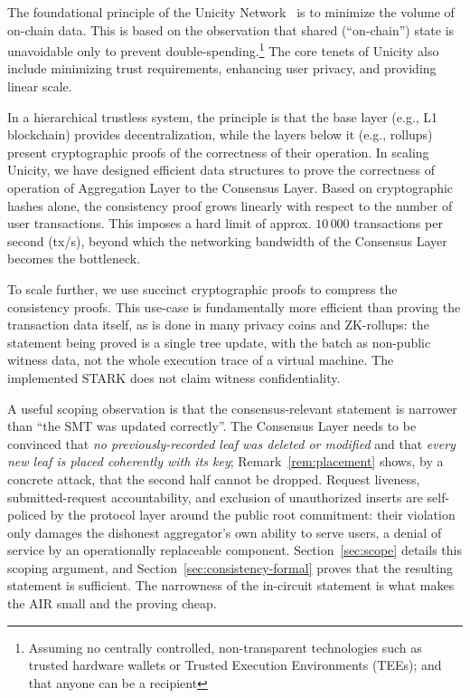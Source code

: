 \documentclass[twocolumn]{article}
\begin{document}
The foundational principle of the Unicity Network~\cite{wp} is to minimize the volume of on-chain data. This is based on the observation that shared (``on-chain'') state is unavoidable only to prevent double-spending.\footnote{Assuming no centrally controlled, non-transparent technologies such as trusted hardware wallets or Trusted Execution Environments (TEEs); and that anyone can be a recipient} The core tenets of Unicity also include minimizing trust requirements, enhancing user privacy, and providing linear scale.

In a hierarchical trustless system, the principle is that the base layer (e.g., L1 blockchain) provides decentralization, while the layers below it (e.g., rollups) present cryptographic proofs of the correctness of their operation. In scaling Unicity, we have designed efficient data structures to prove the correctness of operation of Aggregation Layer to the Consensus Layer. Based on cryptographic hashes alone, the consistency proof grows linearly with respect to the number of user transactions. This imposes a hard limit of approx. $10\,000$ transactions per second (tx/s), beyond which the networking bandwidth of the Consensus Layer becomes the bottleneck.

To scale further, we use succinct cryptographic proofs to compress the consistency proofs. This use-case is fundamentally more efficient than proving the transaction data itself, as is done in many privacy coins and ZK-rollups: the statement being proved is a single tree update, with the batch as non-public witness data, not the whole execution trace of a virtual machine. The implemented STARK does not claim witness confidentiality.

A useful scoping observation is that the consensus-relevant statement is narrower than ``the SMT was updated correctly''. The Consensus Layer needs to be convinced that \emph{no previously-recorded leaf was deleted or modified} and that \emph{every new leaf is placed coherently with its key}; Remark~\ref{rem:placement} shows, by a concrete attack, that the second half cannot be dropped. Request liveness, submitted-request accountability, and exclusion of unauthorized inserts are self-policed by the protocol layer around the public root commitment: their violation only damages the dishonest aggregator's own ability to serve users, a denial of service by an operationally replaceable component. Section~\ref{sec:scope} details this scoping argument, and Section~\ref{sec:consistency-formal} proves that the resulting statement is sufficient. The narrowness of the in-circuit statement is what makes the AIR small and the proving cheap.
\end{document}
